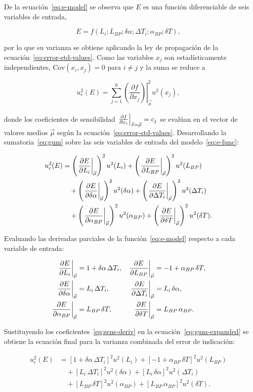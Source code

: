 De la ecuación~\eqref{eq:e-model} se observa que $E$ es una función diferenciable
de seis variables de entrada,

\begin{equation}
  E = f(L_i; L_{BP}; \delta\alpha; \Delta T_i; \alpha_{BP}; \delta T),
  \label{eq:e-func}
\end{equation}

por lo que su varianza se obtiene aplicando la ley de propagación de la
ecuación~\eqref{eq:error-std-values}. Como las variables $x_j$ son estadísticamente
independientes, $\text{Cov}(x_i, x_j) = 0$ para $i \neq j$ y la suma se reduce a

\begin{equation}
  u_c^2(E) = \sum_{j=1}^6 \left. \left( \frac{\partial f}{\partial x_j}
  \right) \right|_{\vec{\mu}}^2 u^2(x_j),
  \label{eq:gum}
\end{equation}

donde los coeficientes de sensibilidad $\left.\frac{\partial f}{\partial x_i}\right|_{\vec x = \vec\mu} = c_j$ se evalúan en el vector de
valores medios $\vec{\mu}$ según la ecuación~\eqref{eq:error-std-values}. Desarrollando
la sumatoria~\eqref{eq:gum} sobre las seis variables de entrada del
modelo~\eqref{eq:e-func}:

\begin{align}
  u_c^2(E) &=
  \left( \left.\frac{\partial E}{\partial L_i}\right|_{\vec\mu} \right)^2 u^2(L_i) +
  \left( \left.\frac{\partial E}{\partial L_{BP}}\right|_{\vec\mu} \right)^2 u^2(L_{BP}) \nonumber \\
  &\quad + \left( \left.\frac{\partial E}{\partial \delta\alpha}\right|_{\vec\mu} \right)^2 u^2(\delta\alpha) +
  \left( \left.\frac{\partial E}{\partial \Delta T_i}\right|_{\vec\mu} \right)^2 u^2(\Delta T_i) \label{eq:gum-expanded} \\
  &\quad + \left( \left.\frac{\partial E}{\partial \alpha_{BP}}\right|_{\vec\mu} \right)^2 u^2(\alpha_{BP}) +
  \left( \left.\frac{\partial E}{\partial \delta T}\right|_{\vec\mu} \right)^2 u^2(\delta T). \nonumber
\end{align}

Evaluando las derivadas parciales de la función~\eqref{eq:e-model} respecto a cada
variable de entrada:

\begin{align}
  \left.\frac{\partial E}{\partial L_i}\right|_{\vec\mu} &= 1 + \delta\alpha \, \Delta T_i, &
  \left.\frac{\partial E}{\partial L_{BP}}\right|_{\vec\mu} &= -1 + \alpha_{BP} \, \delta T, \nonumber \\
  \left.\frac{\partial E}{\partial \delta\alpha}\right|_{\vec\mu} &= L_i \, \Delta T_i, &
  \left.\frac{\partial E}{\partial \Delta T_i}\right|_{\vec\mu} &= L_i \, \delta\alpha, \label{eq:sens-deriv} \\
  \left.\frac{\partial E}{\partial \alpha_{BP}}\right|_{\vec\mu} &= L_{BP} \, \delta T, &
  \left.\frac{\partial E}{\partial \delta T}\right|_{\vec\mu} &= L_{BP} \, \alpha_{BP}. \nonumber
\end{align}

Sustituyendo los coeficientes~\eqref{eq:sens-deriv} en la
ecuación~\eqref{eq:gum-expanded} se obtiene la ecuación final para la varianza
combinada del error de indicación:

\begin{align}
  u_c^2(E) &=
  [1 + \delta\alpha \, \Delta T_i]^2 u^2(L_i) +
  [-1 + \alpha_{BP} \, \delta T]^2 u^2(L_{BP}) \nonumber \\
  &\quad + [L_i \, \Delta T_i]^2 u^2(\delta\alpha) +
  [L_i \, \delta\alpha]^2 u^2(\Delta T_i) \label{eq:sigma-final} \\
  &\quad + [L_{BP} \, \delta T]^2 u^2(\alpha_{BP}) +
  [L_{BP} \, \alpha_{BP}]^2 u^2(\delta T). \nonumber
\end{align}
